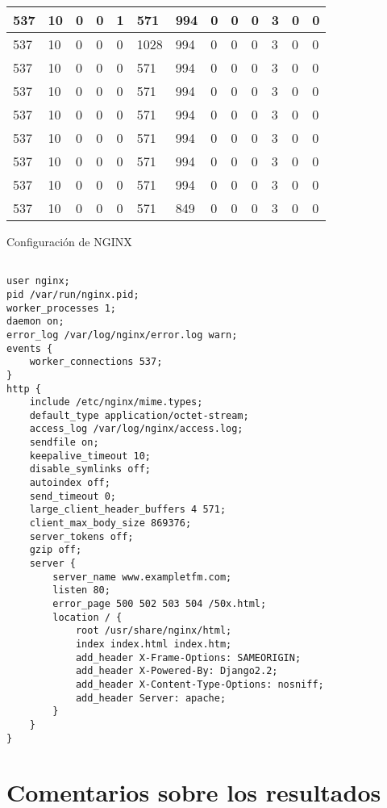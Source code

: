 \begin{table}[H]
\begin{tabular}{|l|l|l|l|l|l|l|l|l|l|l|l|l|}
537  &  10  &  0  &  0  &  1  &  571  &  994  &  0  &  0  &  0  &  3  &  0  &  0 \\ \hline
537  &  10  &  0  &  0  &  0  &  1028  &  994  &  0  &  0  &  0  &  3  &  0  &  0 \\ \hline
537  &  10  &  0  &  0  &  0  &  571  &  994  &  0  &  0  &  0  &  3  &  0  &  0 \\ \hline
537  &  10  &  0  &  0  &  0  &  571  &  994  &  0  &  0  &  0  &  3  &  0  &  0 \\ \hline
537  &  10  &  0  &  0  &  0  &  571  &  994  &  0  &  0  &  0  &  3  &  0  &  0 \\ \hline
537  &  10  &  0  &  0  &  0  &  571  &  994  &  0  &  0  &  0  &  3  &  0  &  0 \\ \hline
537  &  10  &  0  &  0  &  0  &  571  &  994  &  0  &  0  &  0  &  3  &  0  &  0 \\ \hline
537  &  10  &  0  &  0  &  0  &  571  &  994  &  0  &  0  &  0  &  3  &  0  &  0 \\ \hline
537  &  10  &  0  &  0  &  0  &  571  &  849  &  0  &  0  &  0  &  3  &  0  &  0 \\ \hline
\end{tabular}
\end{table}
Configuración de NGINX
\begin{lstlisting}[label={lst:nginx_config_random},caption={Configuración de NGINX tras 20 generaciones}]

user nginx;
pid /var/run/nginx.pid;
worker_processes 1;
daemon on;
error_log /var/log/nginx/error.log warn;
events {
    worker_connections 537;
}
http {
    include /etc/nginx/mime.types;
    default_type application/octet-stream;
    access_log /var/log/nginx/access.log;
    sendfile on;
    keepalive_timeout 10;
    disable_symlinks off;
    autoindex off;
    send_timeout 0;
    large_client_header_buffers 4 571;
    client_max_body_size 869376;
    server_tokens off;
    gzip off;
    server {
        server_name www.exampletfm.com;
        listen 80;
        error_page 500 502 503 504 /50x.html;
        location / {
            root /usr/share/nginx/html;
            index index.html index.htm;
            add_header X-Frame-Options: SAMEORIGIN;
            add_header X-Powered-By: Django2.2;
            add_header X-Content-Type-Options: nosniff;
            add_header Server: apache;
        }
    }
}
\end{lstlisting}

\section{Comentarios sobre los resultados}

